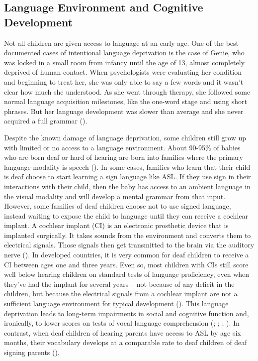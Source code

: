 \documentclass[
]{krantz}
\begin{document}
\subsection*{Language Environment and Cognitive Development}\label{language-environment-and-cognitive-development}


Not all children are given access to language at an early age. One of the best documented cases of intentional language deprivation is the case of Genie, who was locked in a small room from infancy until the age of 13, almost completely deprived of human contact. When psychologists were evaluating her condition and beginning to treat her, she was only able to say a few words and it wasn't clear how much she understood. As she went through therapy, she followed some normal language acquisition milestones, like the one-word stage and using short phrases. But her language development was slower than average and she never acquired a full grammar ().

Despite the known damage of language deprivation, some children still grow up with limited or no access to a language environment. About 90-95\% of babies who are born deaf or hard of hearing are born into families where the primary language modality is speech (). In some cases, families who learn that their child is deaf choose to start learning a sign language like ASL. If they use sign in their interactions with their child, then the baby has access to an ambient language in the visual modality and will develop a mental grammar from that input. However, some families of deaf children choose not to use signed language, instead waiting to expose the child to language until they can receive a cochlear implant. A cochlear implant (CI) is an electronic prosthetic device that is implanted surgically. It takes sounds from the environment and converts them to electrical signals. Those signals then get transmitted to the brain via the auditory nerve (). In developed countries, it is very common for deaf children to receive a CI between ages one and three years. Even so, most children with CIs still score well below hearing children on standard tests of language proficiency, even when they've had the implant for several years -- not because of any deficit in the children, but because the electrical signals from a cochlear implant are not a sufficient language environment for typical development (). This language deprivation leads to long-term impairments in social and cognitive function and, ironically, to lower scores on tests of vocal language comprehension (; ; ; ). In contrast, when deaf children of hearing parents have access to ASL by age six months, their vocabulary develops at a comparable rate to deaf children of deaf signing parents ().
\end{document}

